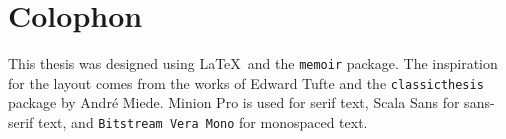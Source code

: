 \pagestyle{empty}
\hfill
\vfill
\section*{Colophon}
This thesis was designed using \LaTeX\ and the \texttt{memoir} package. The inspiration for the layout comes from the works of Edward Tufte and the \texttt{classicthesis} package by André Miede. Minion Pro is used for serif text, {\sffamily Scala Sans} for sans-serif text, and \texttt{Bitstream Vera Mono} for monospaced text.

